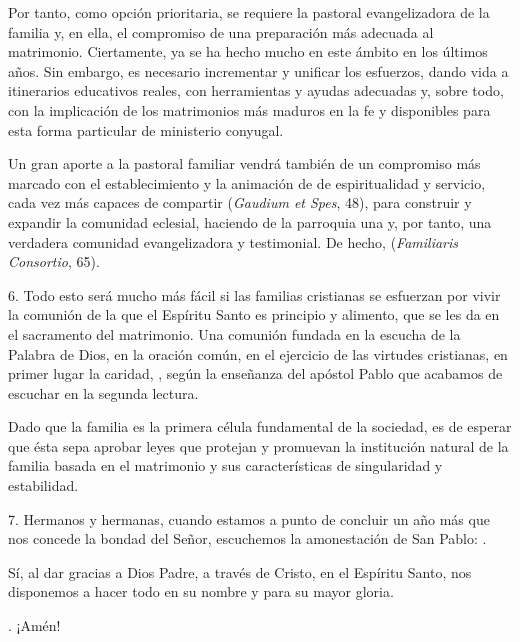 \begin{body}
\begin{body}
		Por tanto, como opción prioritaria, se requiere la pastoral evangelizadora de la familia y, en ella, el compromiso de una preparación más adecuada al matrimonio. Ciertamente, ya se ha hecho mucho en este ámbito en los últimos años. Sin embargo, es necesario incrementar y unificar los esfuerzos, dando vida a itinerarios educativos reales, con herramientas y ayudas adecuadas y, sobre todo, con la implicación de los matrimonios más maduros en la fe y disponibles para esta forma particular de ministerio conyugal.

		Un gran aporte a la pastoral familiar vendrá también de un compromiso más marcado con el establecimiento y la animación de  de espiritualidad y servicio, cada vez más capaces de compartir  (\emph{Gaudium et Spes}, 48), para construir y expandir la comunidad eclesial, haciendo de la parroquia una  y, por tanto, una verdadera comunidad evangelizadora y testimonial. De hecho,  (\emph{Familiaris Consortio}, 65).

		6. Todo esto será mucho más fácil si las familias cristianas se esfuerzan por vivir la comunión de la que el Espíritu Santo es principio y alimento, que se les da en el sacramento del matrimonio. Una comunión fundada en la escucha de la Palabra de Dios, en la oración común, en el ejercicio de las virtudes cristianas, en primer lugar la caridad, , según la enseñanza del apóstol Pablo que acabamos de escuchar en la segunda lectura.

		Dado que la familia es la primera célula fundamental de la sociedad, es de esperar que ésta sepa aprobar leyes que protejan y promuevan la institución natural de la familia basada en el matrimonio y sus características de singularidad y estabilidad.

		7. Hermanos y hermanas, cuando estamos a punto de concluir un año más que nos concede la bondad del Señor, escuchemos la amonestación de San Pablo: .

		Sí, al dar gracias a Dios Padre, a través de Cristo, en el Espíritu Santo, nos disponemos a hacer todo en su nombre y para su mayor gloria.

		. ¡Amén!


\end{body}
\end{body}
